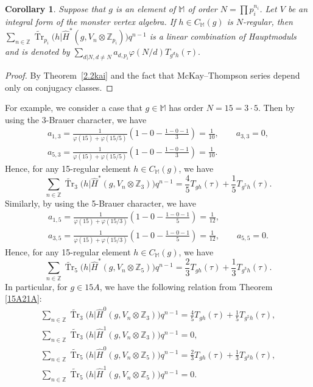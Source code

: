 \documentclass[pdftex]{sigma}%
\numberwithin{equation}{section}
\newtheorem{Corollary}[Theorem]{Corollary}
\begin{document}
\begin{Corollary} \label{newHaup}
Suppose that $g$ is an element of $\mathbb{M}$ of order $N=\prod p_i^{n_i}$. Let $V$ be an integral form of the monster vertex algebra. If $h\in C_{\mathbb{M}}(g)$ is $N$-regular, then $\sum_{n\in \mathbb{Z}}\widetilde{\operatorname{Tr}}_{p_i}\big(h|\hat{H}^*(g,V_n\otimes \mathbb{Z}_{p_i})\big)q^{n-1}$ is a linear combination of Hauptmoduls and is denoted by $\sum_{d|N, d\neq N}a_{d,p_i}\varphi (N/d)T_{g^dh}(\tau).$
\end{Corollary}

\begin{proof}
By Theorem~\ref{2.2kai} and the fact that McKay--Thompson series depend only on conjugacy classes.
\end{proof}

For example, we consider a case that $g\in \mathbb{M}$ has order $N=15=3\cdot 5$. Then by using the 3-Brauer character, we have \begin{gather*}
a_{1,3}=\frac{1}{\varphi(15)+\varphi(15/5)}\left(1-0-\frac{1-0-1}{3}\right)=\frac{1}{10}, \qquad a_{3,3}=0, \\ a_{5,3}=\frac{1}{\varphi(15)+\varphi(15/5)}\left(1-0-\frac{1-0-1}{3}\right)=\frac{1}{10}.
\end{gather*} Hence, for any 15-regular element $h\in C_{\mathbb{M}}(g)$, we have
\[
\sum_{n\in \mathbb{Z}}\widetilde{\operatorname{Tr}}_3\big(h|\hat{H}^*(g,V_n\otimes \mathbb{Z}_3)\big)q^{n-1}= \frac{4}{5}T_{gh}(\tau)+\frac{1}{5}T_{g^5h}(\tau).
\]
Similarly, by using the 5-Brauer character, we have
\begin{gather*}
a_{1,5}=\frac{1}{\varphi(15)+\varphi(15/3)}\left(1-0-\frac{1-0-1}{5}\right)=\frac{1}{12},\\
 a_{3,5}=\frac{1}{\varphi(15)+\varphi(15/3)}\left(1-0-\frac{1-0-1}{5}\right)=\frac{1}{12}, \qquad a_{5,5}=0.
\end{gather*}
 Hence, for any 15-regular element $h\in C_{\mathbb{M}}(g)$, we have
\[
\sum_{n\in \mathbb{Z}}\widetilde{\operatorname{Tr}}_5\big(h|\hat{H}^*(g,V_n\otimes \mathbb{Z}_5)\big)q^{n-1}
= \frac{2}{3}T_{gh}(\tau)+\frac{1}{3}T_{g^3h}(\tau).
\]
In particular, for $g\in 15A$, we have the following relation from Theorem \ref{15A21A}:
\begin{gather*}
\sum_{n\in \mathbb{Z}}\widetilde{\operatorname{Tr}}_3\big(h|\hat{H}^0(g,V_n\otimes \mathbb{Z}_3)\big)q^{n-1}= \frac{4}{5}T_{gh}(\tau)+\frac{1}{5}T_{g^5h}(\tau),\\
\sum_{n\in \mathbb{Z}}\widetilde{\operatorname{Tr}}_3\big(h|\hat{H}^1(g,V_n\otimes \mathbb{Z}_3)\big)q^{n-1}=0,\\
\sum_{n\in \mathbb{Z}}\widetilde{\operatorname{Tr}}_5\big(h|\hat{H}^0(g,V_n\otimes \mathbb{Z}_5)\big)q^{n-1}= \frac{2}{3}T_{gh}(\tau)+\frac{1}{3}T_{g^3h}(\tau),\\
\sum_{n\in \mathbb{Z}}\widetilde{\operatorname{Tr}}_5\big(h|\hat{H}^1(g,V_n\otimes \mathbb{Z}_5)\big)q^{n-1}= 0.
\end{gather*}
\end{document}

